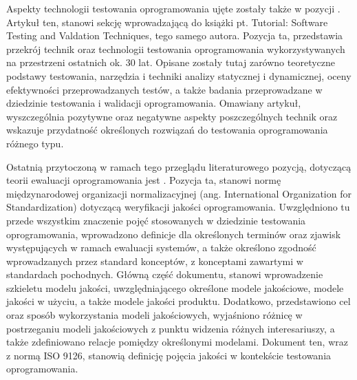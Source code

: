 Aspekty technologii testowania oprogramowania ujęte zostały także w pozycji \cite{miller1981introduction}. Artykuł ten, stanowi sekcję wprowadzającą do książki pt. Tutorial: Software Testing and Valdation Techniques, tego samego autora. Pozycja ta, przedstawia przekrój technik oraz technologii testowania oprogramowania wykorzystywanych na przestrzeni ostatnich ok. 30 lat. Opisane zostały tutaj zarówno teoretyczne podstawy testowania, narzędzia i techniki analizy statycznej i dynamicznej, oceny efektywności przeprowadzanych testów, a także badania przeprowadzane w dziedzinie testowania i walidacji oprogramowania. Omawiany artykuł, wyszczególnia pozytywne oraz negatywne aspekty poszczególnych technik oraz wskazuje przydatność określonych rozwiązań do testowania oprogramowania różnego typu.

Ostatnią przytoczoną w ramach tego przeglądu literaturowego pozycją, dotyczącą teorii ewaluacji oprogramowania jest \cite{25010:2011}. Pozycja ta, stanowi normę międzynarodowej organizacji normalizacyjnej (ang. International Organization for Standardization) dotyczącą weryfikacji jakości oprogramowania. Uwzględniono tu przede wszystkim znaczenie pojęć stosowanych w dziedzinie testowania oprogramowania, wprowadzono definicje dla określonych terminów oraz zjawisk występujących w ramach ewaluacji systemów, a także określono zgodność wprowadzanych przez standard konceptów, z konceptami zawartymi w standardach pochodnych. Główną część dokumentu, stanowi wprowadzenie szkieletu modelu jakości, uwzględniającego określone modele jakościowe, modele jakości w użyciu, a także modele jakości produktu. Dodatkowo, przedstawiono cel oraz sposób wykorzystania modeli jakościowych, wyjaśniono różnicę w postrzeganiu modeli jakościowych z punktu widzenia różnych interesariuszy, a także zdefiniowano relacje pomiędzy określonymi modelami. Dokument ten, wraz z normą ISO 9126, stanowią definicję pojęcia jakości w kontekście testowania oprogramowania.

